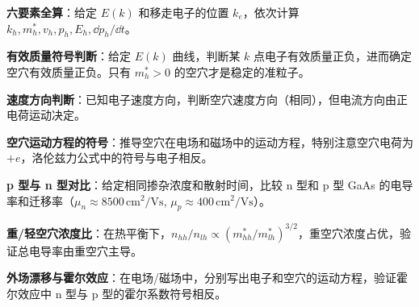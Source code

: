 \begin{drillbox}[训练点与考法变体]
 \textbf{六要素全算}：给定 $E(k)$ 和移走电子的位置 $k_e$，依次计算 $k_h, m_h^*, v_h, p_h, E_h, \dd p_h/\dd t$。

 \textbf{有效质量符号判断}：给定 $E(k)$ 曲线，判断某 $k$ 点电子有效质量正负，进而确定空穴有效质量正负。只有 $m_h^*>0$ 的空穴才是稳定的准粒子。

 \textbf{速度方向判断}：已知电子速度方向，判断空穴速度方向（相同），但电流方向由正电荷运动决定。

 \textbf{空穴运动方程的符号}：推导空穴在电场和磁场中的运动方程，特别注意空穴电荷为 $+e$，洛伦兹力公式中的符号与电子相反。

 \textbf{p 型与 n 型对比}：给定相同掺杂浓度和散射时间，比较 n 型和 p 型 GaAs 的电导率和迁移率（$\mu_n\approx8500\,\text{cm}^2/\text{Vs}$, $\mu_p\approx400\,\text{cm}^2/\text{Vs}$）。

 \textbf{重/轻空穴浓度比}：在热平衡下，$n_{hh}/n_{lh}\propto(m_{hh}^*/m_{lh}^*)^{3/2}$，重空穴浓度占优，验证总电导率由重空穴主导。

 \textbf{外场漂移与霍尔效应}：在电场/磁场中，分别写出电子和空穴的运动方程，验证霍尔效应中 n 型与 p 型的霍尔系数符号相反。
\end{drillbox}

